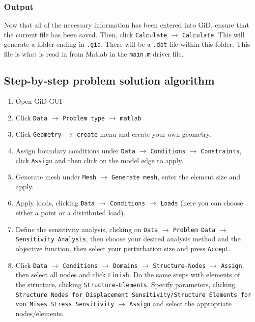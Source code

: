 \subsubsection{Output}
Now that all of the necessary information has been entered into GiD, ensure that the current file has been saved. Then, click \texttt{Calculate} $\rightarrow$ \texttt{Calculate}. This will generate a folder ending in \texttt{.gid}. There will be a \texttt{.dat} file within this folder. This file is what is read in from Matlab in the \texttt{main.m} driver file.  
\subsection{Step-by-step problem solution algorithm} 
\begin{enumerate}
\item Open GiD GUI
\item Click \texttt{Data} $\rightarrow$  \texttt{Problem type} $\rightarrow$ \texttt{matlab}
\item Click \texttt{Geometry} $\rightarrow$  \texttt{create} menu and create your own geometry.
\item Assign boundary conditions under \texttt{Data} $\rightarrow$ \texttt{Conditions} $\rightarrow$ \texttt{Constraints}, click \texttt{Assign} and then click on the model edge to apply.
\item Generate mesh under \texttt{Mesh} $\rightarrow$ \texttt{Generate mesh}, enter the element size and apply.
\item Apply loads, clicking \texttt{Data} $\rightarrow$ \texttt{Conditions} $\rightarrow$ \texttt{Loads} (here you can choose either a point or a distributed load).
\item Define the sensitivity analysis, clicking on \texttt{Data} $\rightarrow$ \texttt{Problem Data} $\rightarrow$ \texttt{Sensitivity Analysis}, then choose your desired analysis method and the objective function, then select your perturbation size and press \texttt{Accept}.  
\item Click \texttt{Data} $\rightarrow$ \texttt{Conditions} $\rightarrow$ \texttt{Domains} $\rightarrow$ \texttt{Structure-Nodes} $\rightarrow$ \texttt{Assign}, then select all nodes and click \texttt{Finish}. Do the same steps with elements of the structure, clicking \texttt{Structure-Elements}. Specify parameters, clicking \texttt{Structure Nodes for Displacement Sensitivity/Structure Elements for von Mises Stress Sensitivity} $\rightarrow$ \texttt{Assign} and select the appropriate nodes/elements.

\end{enumerate}
